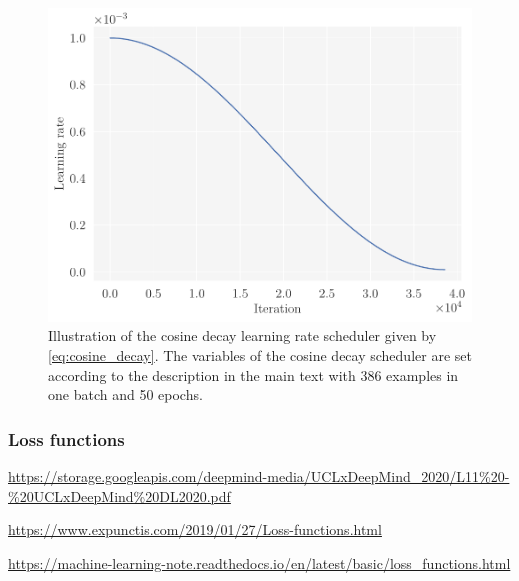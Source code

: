 \begin{figure}[!htb]
\begin{center}\includegraphics[scale=0.7]{latex/figures/lr_schedule.pdf}
\end{center}
\caption{Illustration of the cosine decay learning rate scheduler given by \autoref{eq:cosine_decay}. The variables of the cosine decay scheduler are set according to the description in the main text with 386 examples in one batch and 50 epochs.}
\label{fig:lr_schedule}
\end{figure}


\subsubsection{Loss functions}

\url{https://storage.googleapis.com/deepmind-media/UCLxDeepMind_2020/L11%20-%20UCLxDeepMind%20DL2020.pdf}

\url{https://www.expunctis.com/2019/01/27/Loss-functions.html}

\url{https://machine-learning-note.readthedocs.io/en/latest/basic/loss_functions.html}



